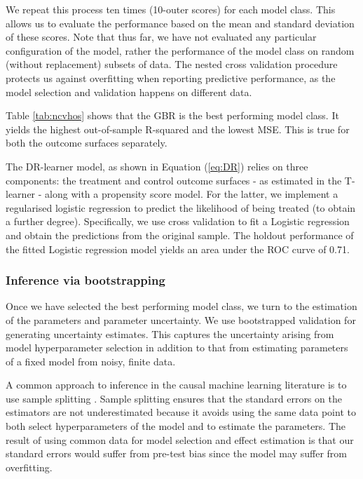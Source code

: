 \documentclass[12pt, a4paper]{article}
\begin{document}
We repeat this process ten times (10-outer scores) for each model class. This
allows us to evaluate the performance based on the mean and standard deviation
of these scores. Note that thus far, we have not evaluated any particular
configuration of the model, rather the performance of the model class on random
(without replacement) subsets of data. The nested cross validation procedure
protects us against overfitting when reporting predictive performance, as the
model selection and validation happens on different data.

Table \ref{tab:ncvhos} shows that the GBR is the best performing model class.
It yields the highest out-of-sample R-squared and the lowest MSE. This is true
for both the outcome surfaces separately.

The DR-learner model, as shown in Equation (\ref{eq:DR}) relies on three components: the treatment and control outcome surfaces - as estimated in the T-learner - along with a propensity score model. For the latter, we implement a regularised logistic regression to predict the likelihood of being treated (to obtain a further degree). Specifically, we use cross validation to fit a Logistic regression and obtain the predictions from the original sample. The holdout performance of the fitted Logistic regression model yields an area under the ROC curve of 0.71.

\subsubsection*{Inference via bootstrapping}

Once we have selected the best performing model class, we turn to the
estimation of the parameters and parameter uncertainty. We use bootstrapped
validation for generating uncertainty estimates. This captures the uncertainty
arising from model hyperparameter selection in addition to that from estimating
parameters of a fixed model from noisy, finite data. 


A common approach to inference in the causal machine learning literature is to
use sample splitting \citep{athey2019}. Sample splitting ensures that the
standard errors on the estimators are not underestimated because it avoids
using the same data point to both select hyperparameters of the model and to
estimate the parameters. 
The result of using common data for model selection and effect estimation is
that our standard errors would suffer from pre-test bias since the model may
suffer from overfitting.
\end{document}

